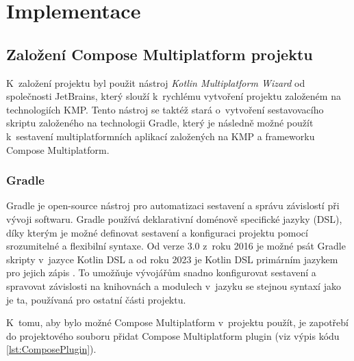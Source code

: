 \chapter{Implementace}


\section{Založení Compose Multiplatform projektu}
K~založení projektu byl použit nástroj \textit{Kotlin Multiplatform Wizard} od společnosti JetBrains, který slouží k~rychlému vytvoření projektu
založeném na technologiích KMP. Tento nástroj se taktéž stará o~vytvoření sestavovacího skriptu založeného na technologii Gradle, který je následně možné 
použít k~sestavení multiplatformních aplikací založených na KMP a frameworku Compose Multiplatform.
 
 



%

\subsection{Gradle} \label{gradleChapter}
Gradle je open-source nástroj pro automatizaci sestavení a správu závislostí při vývoji softwaru. \cite{gradle}
Gradle používá deklarativní doménově specifické jazyky (DSL), díky kterým je možné definovat sestavení a konfiguraci projektu pomocí srozumitelné
a flexibilní syntaxe. Od verze 3.0 z~roku 2016 je možné psát Gradle skripty v~jazyce Kotlin DSL a od roku 2023 je Kotlin DSL primárním jazykem 
pro jejich zápis \cite{gradleKot}. To umožňuje vývojářům snadno konfigurovat sestavení a spravovat závislosti na knihovnách a modulech v~jazyku se stejnou
syntaxí jako je ta, používaná pro ostatní části projektu. 



K~tomu, aby bylo možné Compose Multiplatform v~projektu použít, je zapotřebí do projektového souboru  přidat Compose 
Multiplatform plugin (viz výpis kódu \ref{lst:ComposePlugin}).

